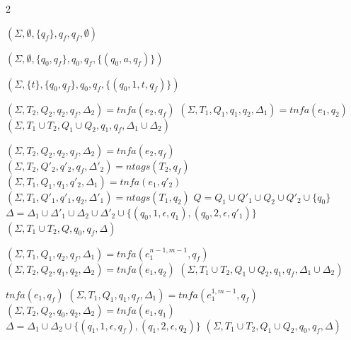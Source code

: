 \documentclass[]{article}
\let\oldnl\nl%
\newcommand{\nonl}{\renewcommand{\nl}{\let\nl\oldnl}}%
\newcommand{\XN}{\mathcal{N}}
\newcommand{\YN}{\mathbb{N}}
\begin{document}
\begin{algorithm}[] \DontPrintSemicolon {}
\begin{multicols}{2}

    \newcommand \retonfa {tn\!f\!a}%
    \newcommand \ntag {ntags}
    \Indm
    \small

    \nonl\Fn {$\underline{\retonfa(e, q_f)} \smallskip$} {

     {
        \Return $(\Sigma, \emptyset, \{q_f\}, q_f, q_f, \emptyset)$
    }
    \BlankLine
    \BlankLine

     {
        \Return $(\Sigma, \emptyset, \{q_0,q_f\}, q_0, q_f, \{(q_0, a, q_f)\})$
    }
    \BlankLine
    \BlankLine

    \ElseIf {$e = t \in \YN$} {
        \Return $(\Sigma, \{t\}, \{q_0, q_f\}, q_0, q_f, \{(q_0, 1, t, q_f)\})$
    }
    \BlankLine
    \BlankLine

     {
        $(\Sigma, T_2, Q_2, q_2, q_f, \Delta_2) = \retonfa (e_2, q_f)$ \;
        $(\Sigma, T_1, Q_1, q_1, q_2, \Delta_1) = \retonfa (e_1, q_2)$ \;
        \Return $(\Sigma, T_1 \cup T_2, Q_1 \cup Q_2, q_1, q_f, \Delta_1 \cup \Delta_2)$
    }
    \BlankLine
    \BlankLine

     {
        $(\Sigma, T_2, Q_2, q_2, q_f, \Delta_2) = \retonfa (e_2, q_f)$ \;
        $(\Sigma, T_2, Q'_2, q'_2, q_f, \Delta'_2) = \ntag (T_2, q_f)$ \;
        $(\Sigma, T_1, Q_1, q_1, q'_2, \Delta_1) = \retonfa (e_1, q'_2)$ \;
        $(\Sigma, T_1, Q'_1, q'_1, q_2, \Delta'_1) = \ntag (T_1, q_2)$ \;
        $Q = Q_1 \cup Q'_1 \cup Q_2 \cup Q'_2 \cup \{q_0\}$ \;
        $\Delta = \Delta_1 \cup \Delta'_1 \cup \Delta_2 \cup \Delta'_2 \cup \{ (q_0,1,\epsilon,q_1), (q_0,2,\epsilon,q'_1) \}$ \;
        \Return $(\Sigma, T_1 \cup T_2, Q, q_0, q_f, \Delta)$
    }
    \BlankLine
    \BlankLine

     {
        $(\Sigma, T_1, Q_1, q_2, q_f, \Delta_1) = \retonfa(e_1^{n\!-\!1, m\!-\!1}, q_f)$ \;
        $(\Sigma, T_2, Q_2, q_1, q_2, \Delta_2) = \retonfa(e_1, q_2)$ \;
        \Return $(\Sigma, T_1 \cup T_2, Q_1 \cup Q_2, q_1, q_f, \Delta_1 \cup \Delta_2)$
    }
    \BlankLine
    \BlankLine

     {
         {
            \Return $\retonfa (e_1, q_f)$
        }
        $(\Sigma, T_1, Q_1, q_1, q_f, \Delta_1) = \retonfa (e_1^{1, m\!-\!1}, q_f)$ \;
        $(\Sigma, T_2, Q_2, q_0, q_2, \Delta_2) = \retonfa (e_1, q_1)$ \;
        $\Delta = \Delta_1 \cup \Delta_2 \cup \{ (q_1, 1, \epsilon, q_f), (q_1, 2, \epsilon, q_2) \}$ \;
        \Return $(\Sigma, T_1 \cup T_2, Q_1 \cup Q_2, q_0, q_f, \Delta)$
    }
    \BlankLine
    \BlankLine

}
\end{multicols}
\end{algorithm}
\end{document}

